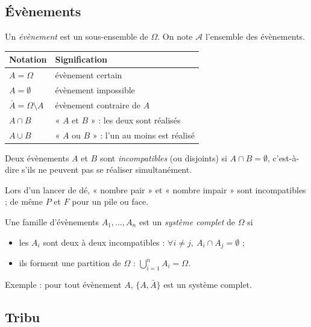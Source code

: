 \documentclass[11pt,a4paper]{article}
\newcommand{\A}{\mathcal{A}}
\newcommand{\1}{\mathbf{1}}
\begin{document}
\subsection{Évènements}

Un \emph{évènement} est un sous-ensemble de $\Omega$. On note $\A$ l'ensemble des évènements.

\begin{center}
\begin{tabular}{ll}
\toprule
\textbf{Notation} & \textbf{Signification}\\
\midrule
$A=\Omega$ & évènement certain\\
$A=\emptyset$ & évènement impossible\\
$\bar A=\Omega\setminus A$ & évènement contraire de $A$\\
$A\cap B$ & « $A$ et $B$ » : les deux sont réalisés\\
$A\cup B$ & « $A$ ou $B$ » : l'un au moins est réalisé\\
\bottomrule
\end{tabular}
\end{center}

\begin{definition}
Deux évènements $A$ et $B$ sont \emph{incompatibles} (ou disjoints) si $A\cap B=\emptyset$, c'est-à-dire s'ils ne peuvent pas se réaliser simultanément.
\end{definition}

\begin{exemple}
Lors d'un lancer de dé, « nombre pair » et « nombre impair » sont incompatibles ; de même $P$ et $F$ pour un pile ou face.
\end{exemple}

\begin{definition}
Une famille d'évènements $A_1,\dots,A_n$ est un \emph{système complet} de $\Omega$ si
\begin{itemize}
  \item les $A_i$ sont deux à deux incompatibles : $\forall i\neq j,\ A_i\cap A_j=\emptyset$ ;
  \item ils forment une partition de $\Omega$ : $\bigcup_{i=1}^{n}A_i=\Omega$.
\end{itemize}
Exemple : pour tout évènement $A$, $\{A,\bar A\}$ est un système complet.
\end{definition}

\subsection{Tribu}
\end{document}
